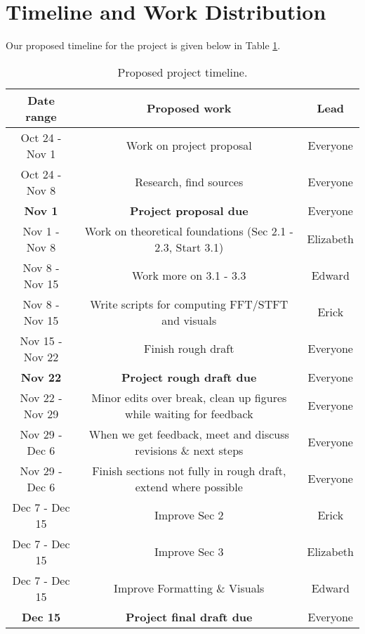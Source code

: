 \documentclass[10pt]{article}
\begin{document}
\section{Timeline and Work Distribution}

Our proposed timeline for the project is given below in Table \ref{tab:timeline}.

\begin{table}[H]
    \centering
    \begin{tabular}{|c|c|c|} 
     \hline
     Date range & Proposed work & Lead \\
     \hline
     Oct 24 - Nov 1 & Work on project proposal & Everyone \\
     \hline
     Oct 24 - Nov 8 & Research, find sources & Everyone \\
     \hline
     \textbf{Nov 1} & \textbf{Project proposal due} & Everyone \\ \hline
     Nov 1 - Nov 8 & Work on theoretical foundations (Sec 2.1 - 2.3, Start 3.1) & Elizabeth\\
     \hline
     Nov 8 - Nov 15 & Work more on 3.1 - 3.3& Edward\\
     \hline
     Nov 8 - Nov 15 & Write scripts for computing FFT/STFT and visuals & Erick\\
     \hline
     Nov 15 - Nov 22 & Finish rough draft & Everyone\\
     \hline
     \textbf{Nov 22} & \textbf{Project rough draft due} & Everyone \\ \hline
     Nov 22 - Nov 29 & Minor edits over break, clean up figures while waiting for feedback & Everyone \\
     \hline
     Nov 29 - Dec 6 & When we get feedback, meet and discuss revisions \& next steps & Everyone \\
     \hline
     Nov 29 - Dec 6 & Finish sections not fully in rough draft, extend where possible & Everyone\\
     \hline
    Dec 7 - Dec 15 & Improve Sec 2 & Erick \\ 
     \hline
     Dec 7 - Dec 15 & Improve Sec 3 & Elizabeth \\
     \hline
     Dec 7 - Dec 15 & Improve Formatting \& Visuals & Edward \\
     \hline
     \textbf{Dec 15} & \textbf{Project final draft due} & Everyone \\ \hline
    \end{tabular}
    \caption{Proposed project timeline.}
    \label{tab:timeline}
\end{table}

\printbibliography
\end{document}
